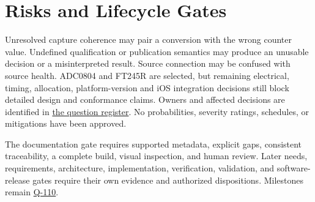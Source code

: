 \section{Risks and Lifecycle Gates}
Unresolved capture coherence may pair a conversion with the wrong counter value. Undefined qualification or publication semantics may produce an unusable decision or a misinterpreted result. Source connection may be confused with source health. ADC0804 and FT245R are selected, but remaining electrical, timing, allocation, platform-version and iOS integration decisions still block detailed design and conformance claims. Owners and affected decisions are identified in \hyperref[Table:OwnedQuestions]{the question register}. No probabilities, severity ratings, schedules, or mitigations have been approved.

The documentation gate requires supported metadata, explicit gaps, consistent traceability, a complete build, visual inspection, and human review. Later needs, requirements, architecture, implementation, verification, validation, and software-release gates require their own evidence and authorized dispositions. Milestones remain \hyperref[Question:Q-110]{Q-110}.
